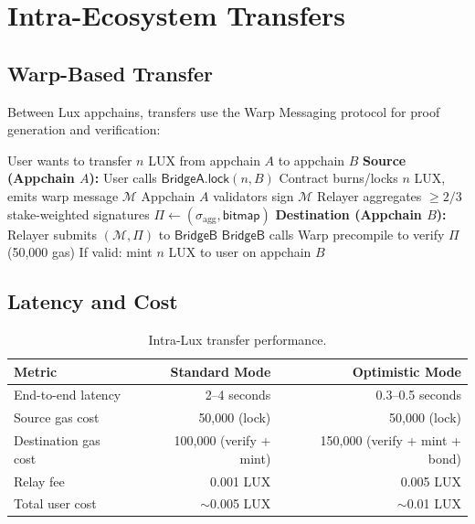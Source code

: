 \section{Intra-Ecosystem Transfers}
\label{sec:intra}

\subsection{Warp-Based Transfer}

Between Lux appchains, transfers use the Warp Messaging protocol for proof generation and verification:

\begin{algorithm}[H]
\caption{Intra-Lux Token Transfer}
\label{alg:intra}
\begin{algorithmic}[1]
\Require User wants to transfer $n$ LUX from appchain $A$ to appchain $B$
\State \textbf{Source (Appchain $A$):}
\State User calls $\mathsf{BridgeA.lock}(n, B)$
\State Contract burns/locks $n$ LUX, emits warp message $\mathcal{M}$
\State Appchain $A$ validators sign $\mathcal{M}$
\State Relayer aggregates $\geq 2/3$ stake-weighted signatures
\State $\Pi \gets (\sigma_{\text{agg}}, \mathsf{bitmap})$
\State \textbf{Destination (Appchain $B$):}
\State Relayer submits $(\mathcal{M}, \Pi)$ to $\mathsf{BridgeB}$
\State $\mathsf{BridgeB}$ calls Warp precompile to verify $\Pi$ (50,000 gas)
\State If valid: mint $n$ LUX to user on appchain $B$
\end{algorithmic}
\end{algorithm}

\subsection{Latency and Cost}

\begin{table}[H]
\centering
\caption{Intra-Lux transfer performance.}
\label{tab:intra_perf}
\begin{tabular}{lrr}
\toprule
\textbf{Metric} & \textbf{Standard Mode} & \textbf{Optimistic Mode} \\
\midrule
End-to-end latency & 2--4 seconds & 0.3--0.5 seconds \\
Source gas cost & 50,000 (lock) & 50,000 (lock) \\
Destination gas cost & 100,000 (verify + mint) & 150,000 (verify + mint + bond) \\
Relay fee & 0.001 LUX & 0.005 LUX \\
Total user cost & $\sim$0.005 LUX & $\sim$0.01 LUX \\
\bottomrule
\end{tabular}
\end{table}


